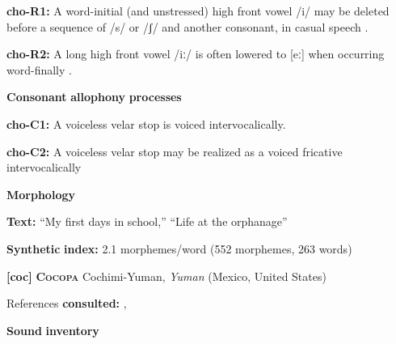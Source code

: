 \begin{styleBody}
\textbf{cho-R1:} A word-initial (and unstressed) high front vowel /i/ may be deleted before a sequence of /s/ or /ʃ/ and another consonant, in casual speech \citep[19]{Broadwell2006}.
\end{styleBody}

\begin{styleBody}
\textbf{cho-R2:} A long high front vowel /iː/ is often lowered to [eː] when occurring word-finally \citep[30]{Broadwell2006}.
\end{styleBody}

\begin{styleBody}
\textbf{Consonant} \textbf{allophony} \textbf{processes}
\end{styleBody}

\begin{styleBody}
\textbf{cho-C1:} A voiceless velar stop is voiced intervocalically. \citep[15]{Broadwell2006}
\end{styleBody}

\begin{styleBody}
\textbf{cho-C2:}  A voiceless velar stop may be realized as a voiced fricative intervocalically \citep[15]{Broadwell2006}
\end{styleBody}

\begin{styleBody}
\textbf{Morphology}
\end{styleBody}

\begin{styleBody}
\textbf{Text:} “My first days in school,” “Life at the orphanage” \citep[355-360]{Broadwell2006}
\end{styleBody}

\begin{styleBody}
\textbf{Synthetic} \textbf{index:} 2.1 morphemes/word (552 morphemes, 263 words)
\end{styleBody}

\begin{styleBody}
\textbf{[coc]}   \textbf{\textsc{Cocopa}}    Cochimi-Yuman, \textit{Yuman} (Mexico, United States)
\end{styleBody}

\begin{styleBody}
References \textbf{consulted:} \citet{Bendixen1980}, \citet{Crawford1966}
\end{styleBody}

\begin{styleBody}
\textbf{Sound} \textbf{inventory}
\end{styleBody}

